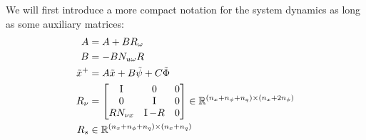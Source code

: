 \documentclass{ifacconf}
\theoremstyle{plain}
\begin{document}
We will first introduce a more compact notation for the system dynamics as long as some auxiliary matrices:
\begin{equation}\label{eqn:auxiliary}
\begin{aligned}
    \relax{A} &= A + B R_{\omega}\\
    \relax{B} &= -B N_{u \omega} R\\
    \tilde{x}^+ &= \relax{A}\tilde{x} + \relax{B}\tilde{\psi} + C \tilde{\Phi}\\
R_{\nu} &= \left[\begin{matrix}
  \operatorname{I} & 0 & 0 \\
  0 & \operatorname{I} & 0 \\
  R N_{\nu x} & \operatorname{I} - R & 0\\
\end{matrix}\right] \in {\mathbb{R}}^{(n_x + n_{\phi} + n_q) \times (n_x + 2 n_{\phi})}\\
R_s &\in {\mathbb{R}}^{(n_x + n_{\phi} + n_q) \times (n_x + n_q)}
\end{aligned}
\end{equation}
\end{document}
